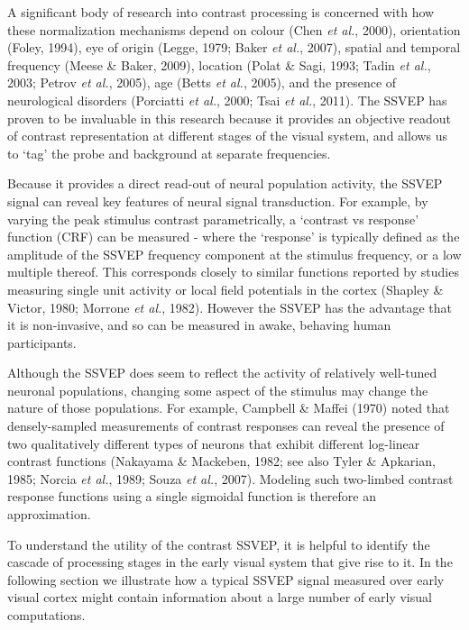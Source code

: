 \documentclass[
  letterpaper,
  DIV=11,
  numbers=noendperiod]{scrartcl}
\begin{document}
A significant body of research into contrast processing is concerned
with how these normalization mechanisms depend on colour (Chen \emph{et
al.}, 2000), orientation (Foley, 1994), eye of origin (Legge, 1979;
Baker \emph{et al.}, 2007), spatial and temporal frequency (Meese \&
Baker, 2009), location (Polat \& Sagi, 1993; Tadin \emph{et al.}, 2003;
Petrov \emph{et al.}, 2005), age (Betts \emph{et al.}, 2005), and the
presence of neurological disorders (Porciatti \emph{et al.}, 2000; Tsai
\emph{et al.}, 2011). The SSVEP has proven to be invaluable in this
research because it provides an objective readout of contrast
representation at different stages of the visual system, and allows us
to `tag' the probe and background at separate frequencies.

Because it provides a direct read-out of neural population activity, the
SSVEP signal can reveal key features of neural signal transduction. For
example, by varying the peak stimulus contrast parametrically, a
`contrast vs response' function (CRF) can be measured - where the
`response' is typically defined as the amplitude of the SSVEP frequency
component at the stimulus frequency, or a low multiple thereof. This
corresponds closely to similar functions reported by studies measuring
single unit activity or local field potentials in the cortex (Shapley \&
Victor, 1980; Morrone \emph{et al.}, 1982). However the SSVEP has the
advantage that it is non-invasive, and so can be measured in awake,
behaving human participants.

Although the SSVEP does seem to reflect the activity of relatively
well-tuned neuronal populations, changing some aspect of the stimulus
may change the nature of those populations. For example, Campbell \&
Maffei (1970) noted that densely-sampled measurements of contrast
responses can reveal the presence of two qualitatively different types
of neurons that exhibit different log-linear contrast functions
(Nakayama \& Mackeben, 1982; see also Tyler \& Apkarian, 1985; Norcia
\emph{et al.}, 1989; Souza \emph{et al.}, 2007). Modeling such
two-limbed contrast response functions using a single sigmoidal function
is therefore an approximation.

To understand the utility of the contrast SSVEP, it is helpful to
identify the cascade of processing stages in the early visual system
that give rise to it. In the following section we illustrate how a
typical SSVEP signal measured over early visual cortex might contain
information about a large number of early visual computations.
\end{document}
